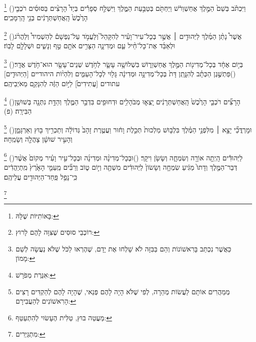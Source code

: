 \documentclass[12pt, openany]{book}
\newcommand{\footnotecomment}[1]{
	\renewcommand\thefootnote{}
	\footnote{\textsf{#1}}}
\newcommand{\commenta}[1]{\footnotecomment{#1}\hspace{0em}}
\newcommand{\vsnum}[1]{(\hebrewnumeral{#1})\space}
\begin{document}
\begin{multicols}{2}
\commenta{ בָּאוֹתִיּוֹת שֶׁלָּהּ:}%
\vsnum{10}וַיִּכְתֹּ֗ב בְּשֵׁם֙ הַמֶּ֣לֶךְ אֲחַשְׁוֵרֹ֔שׁ וַיַּחְתֹּ֖ם בְּטַבַּ֣עַת הַמֶּ֑לֶךְ וַיִּשְׁלַ֣ח סְפָרִ֡ים בְּיַד֩ הָרָצִ֨ים בַּסּוּסִ֜ים רֹכְבֵ֤י הָרֶ֙כֶשׁ֙ הָֽאֲחַשְׁתְּרָנִ֔ים בְּנֵ֖י הָֽרַמָּכִֽים׃%
\commenta{ רוֹכְבֵי סוּסִים שֶׁצִּוָּה לָהֶם לָרוּץ:}%
\vsnum{11}אֲשֶׁר֩ נָתַ֨ן הַמֶּ֜לֶךְ לַיְּהוּדִ֣ים ׀ אֲשֶׁ֣ר בְּכָל־עִיר־וָעִ֗יר לְהִקָּהֵל֮ וְלַעֲמֹ֣ד עַל־נַפְשָׁם֒ לְהַשְׁמִיד֩ וְלַהֲרֹ֨ג וּלְאַבֵּ֜ד אֶת־כָּל־חֵ֨יל עַ֧ם וּמְדִינָ֛ה הַצָּרִ֥ים אֹתָ֖ם טַ֣ף וְנָשִׁ֑ים וּשְׁלָלָ֖ם לָבֽוֹז׃%
\commenta{ כַּאֲשֶׁר נִכְתַּב בָּרִאשׁוֹנוֹת וְהֵם בַּבִּזָּה לֹא שָׁלְחוּ אֶת יָדָם, שֶׁהֶרְאוּ לַכֹּל שֶׁלֹּא נַעֲשָׂה לְשֵׁם מָמוֹן: }%
\vsnum{12}בְּי֣וֹם אֶחָ֔ד בְּכָל־מְדִינ֖וֹת הַמֶּ֣לֶךְ אֲחַשְׁוֵר֑וֹשׁ בִּשְׁלוֹשָׁ֥ה עָשָׂ֛ר לְחֹ֥דֶשׁ שְׁנֵים־עָשָׂ֖ר הוּא־חֹ֥דֶשׁ אֲדָֽר׃
\vsnum{13}פַּתְשֶׁ֣גֶן הַכְּתָ֗ב לְהִנָּ֤תֵֽן דָּת֙ בְּכָל־מְדִינָ֣ה וּמְדִינָ֔ה גָּל֖וּי לְכָל־הָעַמִּ֑ים וְלִהְי֨וֹת היהודיים [הַיְּהוּדִ֤ים] עתודים [עֲתִידִים֙] לַיּ֣וֹם הַזֶּ֔ה לְהִנָּקֵ֖ם מֵאֹיְבֵיהֶֽם׃%
\commenta{ אִגֶּרֶת מְפֹרָשׁ:}%
\vsnum{14}הָרָצִ֞ים רֹכְבֵ֤י הָרֶ֙כֶשׁ֙ הָֽאֲחַשְׁתְּרָנִ֔ים יָֽצְא֛וּ מְבֹהָלִ֥ים וּדְחוּפִ֖ים בִּדְבַ֣ר הַמֶּ֑לֶךְ וְהַדָּ֥ת נִתְּנָ֖ה בְּשׁוּשַׁ֥ן הַבִּירָֽה׃ (פ)%
\commenta{ מְמַהֲרִים אוֹתָם לַעֲשׂוֹת מְהֵרָה, לְפִי שֶׁלֹּא הָיָה לָהֶם פְּנַאי, שֶׁהָיָה לָהֶם לְהַקְדִּים רָצִים הָרִאשׁוֹנִים לְהַעֲבִירָם: }%
\vsnum{15}וּמָרְדֳּכַ֞י יָצָ֣א ׀ מִלִּפְנֵ֣י הַמֶּ֗לֶךְ בִּלְב֤וּשׁ מַלְכוּת֙ תְּכֵ֣לֶת וָח֔וּר וַעֲטֶ֤רֶת זָהָב֙ גְּדוֹלָ֔ה וְתַכְרִ֥יךְ בּ֖וּץ וְאַרְגָּמָ֑ן וְהָעִ֣יר שׁוּשָׁ֔ן צָהֲלָ֖ה וְשָׂמֵֽחָה׃%
\commenta{ מַעֲטֵה בוּץ, טַלִּית הֶעָשׂוּי לְהִתְעַטֵּף: }%
\vsnum{16}לַיְּהוּדִ֕ים הָֽיְתָ֥ה אוֹרָ֖ה וְשִׂמְחָ֑ה וְשָׂשֹׂ֖ן וִיקָֽר׃
\vsnum{17}וּבְכָל־מְדִינָ֨ה וּמְדִינָ֜ה וּבְכָל־עִ֣יר וָעִ֗יר מְקוֹם֙ אֲשֶׁ֨ר דְּבַר־הַמֶּ֤לֶךְ וְדָתוֹ֙ מַגִּ֔יעַ שִׂמְחָ֤ה וְשָׂשׂוֹן֙ לַיְּהוּדִ֔ים מִשְׁתֶּ֖ה וְי֣וֹם ט֑וֹב וְרַבִּ֞ים מֵֽעַמֵּ֤י הָאָ֙רֶץ֙ מִֽתְיַהֲדִ֔ים כִּֽי־נָפַ֥ל פַּֽחַד־הַיְּהוּדִ֖ים עֲלֵיהֶֽם׃%
\commenta{ מִתְגַּיְּרִים:}%
\end{multicols}\newpage
\end{document}
